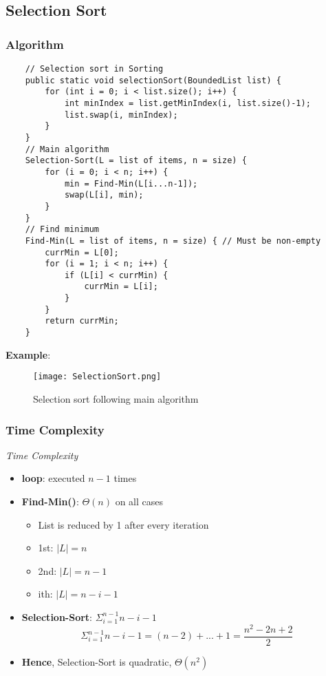 \documentclass[10pt, 
a4paper, 
oneside, 
headinclude, footinclude, 
BCOR5mm]
{scrartcl}
\begin{document}
\subsection{Selection Sort}
\subsubsection{Algorithm}
\begin{lstlisting}
    // Selection sort in Sorting
    public static void selectionSort(BoundedList list) {
        for (int i = 0; i < list.size(); i++) {
            int minIndex = list.getMinIndex(i, list.size()-1);
            list.swap(i, minIndex);
        }
    }
    // Main algorithm
    Selection-Sort(L = list of items, n = size) {
        for (i = 0; i < n; i++) {
            min = Find-Min(L[i...n-1]);
            swap(L[i], min);
        }
    }
    // Find minimum
    Find-Min(L = list of items, n = size) { // Must be non-empty
        currMin = L[0];
        for (i = 1; i < n; i++) {
            if (L[i] < currMin) {
                currMin = L[i];
            }
        }
        return currMin;
    }
\end{lstlisting}
\textbf{Example}:
\begin{figure}[H]
    \begin{center}
        \texttt{[image: SelectionSort.png]}
        \caption{Selection sort following main algorithm}
    \end{center}
\end{figure}
\subsubsection{Time Complexity}
\begin{definition}
    \textit{Time Complexity}
    \begin{itemize}
        \item \textbf{loop}: executed $n-1$ times
        \item \textbf{Find-Min()}: $\Theta(n)$ on all cases
        \begin{itemize}
            \item List is reduced by 1 after every iteration
            \item 1st: $|L|=n$
            \item 2nd: $|L|=n-1$
            \item ith: $|L|=n-i-1$
        \end{itemize}
        \item \textbf{Selection-Sort}: $\Sigma^{n-1}_{i=1}n-i-1$ $$\Sigma^{n-1}_{i=1}n-i-1=(n-2)+...+1=\frac{n^2-2n+2}{2}$$
        \item \textbf{Hence}, Selection-Sort is quadratic, $\Theta(n^2)$
    \end{itemize}
\end{definition}
\end{document}
